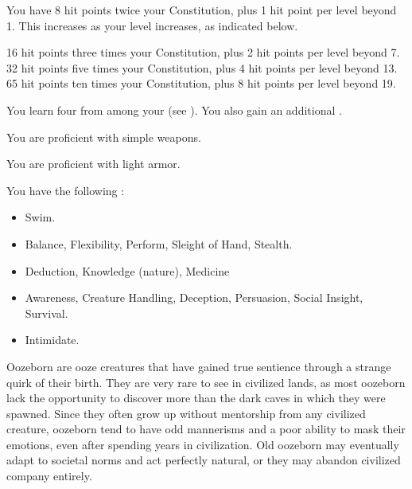       You have 8 hit points \add twice your Constitution, plus 1 hit point per level beyond 1.
      This increases as your level increases, as indicated below.
      \begin{itemize}
         16 hit points \add three times your Constitution, plus 2 hit points per level beyond 7.
         32 hit points \add five times your Constitution, plus 4 hit points per level beyond 13.
         65 hit points \add ten times your Constitution, plus 8 hit points per level beyond 19.
      \end{itemize}

      You learn four  from among your  (see ). You also gain an additional .

      You are proficient with simple weapons.

      You are proficient with light armor.

      You have the following :
      \begin{itemize}
        \item {} Swim.
        \item {} Balance, Flexibility, Perform, Sleight of Hand, Stealth.
        \item {} Deduction, Knowledge (nature), Medicine
        \item {} Awareness, Creature Handling, Deception, Persuasion, Social Insight, Survival.
        \item {} Intimidate.
      \end{itemize}

  Oozeborn are ooze creatures that have gained true sentience through a strange quirk of their birth.
  They are very rare to see in civilized lands, as most oozeborn lack the opportunity to discover more than the dark caves in which they were spawned.
  Since they often grow up without mentorship from any civilized creature, oozeborn tend to have odd mannerisms and a poor ability to mask their emotions, even after spending years in civilization.
  Old oozeborn may eventually adapt to societal norms and act perfectly natural, or they may abandon civilized company entirely.


